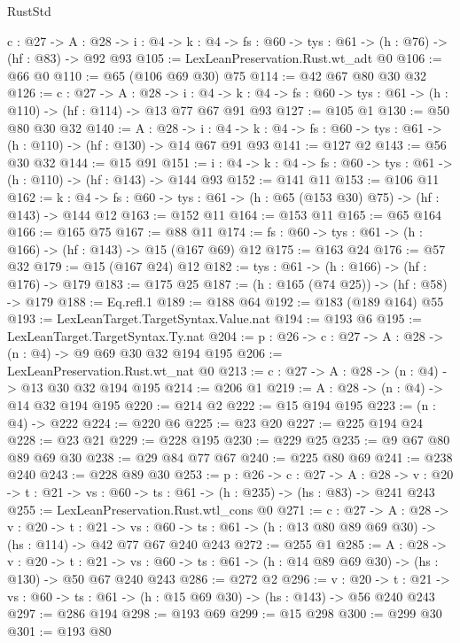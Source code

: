 \begin{lexlean}{RustStd}
\begin{coremodule}
{\begin{coremodule}
{  {c : @27} ->
  {A : @28} ->
  {i : @4} -> {k : @4} -> {fs : @60} -> {tys : @61} -> (h : @76) -> (hf : @83) -> @92 @93
@105 := LexLeanPreservation.Rust.wt_adt @0
@106 := @66 @0
@110 := @65 (@106 @69 @30) @75
@114 := @42 @67 @80 @30 @32
@126 := {c : @27} ->
  {A : @28} ->
  {i : @4} ->
  {k : @4} -> {fs : @60} -> {tys : @61} -> (h : @110) -> (hf : @114) -> @13 @77 @67 @91 @93
@127 := @105 @1
@130 := @50 @80 @30 @32
@140 := {A : @28} ->
  {i : @4} -> {k : @4} -> {fs : @60} -> {tys : @61} -> (h : @110) -> (hf : @130) -> @14 @67 @91 @93
@141 := @127 @2
@143 := @56 @30 @32
@144 := @15 @91
@151 := {i : @4} -> {k : @4} -> {fs : @60} -> {tys : @61} -> (h : @110) -> (hf : @143) -> @144 @93
@152 := @141 @11
@153 := @106 @11
@162 := {k : @4} -> {fs : @60} -> {tys : @61} -> (h : @65 (@153 @30) @75) -> (hf : @143) -> @144 @12
@163 := @152 @11
@164 := @153 @11
@165 := @65 @164
@166 := @165 @75
@167 := @88 @11
@174 := {fs : @60} -> {tys : @61} -> (h : @166) -> (hf : @143) -> @15 (@167 @69) @12
@175 := @163 @24
@176 := @57 @32
@179 := @15 (@167 @24) @12
@182 := {tys : @61} -> (h : @166) -> (hf : @176) -> @179
@183 := @175 @25
@187 := (h : @165 (@74 @25)) -> (hf : @58) -> @179
@188 := Eq.refl.{1}
@189 := @188 @64
@192 := @183 (@189 @164) @55
@193 := LexLeanTarget.TargetSyntax.Value.nat
@194 := @193 @6
@195 := LexLeanTarget.TargetSyntax.Ty.nat
@204 := {p : @26} -> {c : @27} -> {A : @28} -> (n : @4) -> @9 @69 @30 @32 @194 @195
@206 := LexLeanPreservation.Rust.wt_nat @0
@213 := {c : @27} -> {A : @28} -> (n : @4) -> @13 @30 @32 @194 @195
@214 := @206 @1
@219 := {A : @28} -> (n : @4) -> @14 @32 @194 @195
@220 := @214 @2
@222 := @15 @194 @195
@223 := (n : @4) -> @222
@224 := @220 @6
@225 := @23 @20
@227 := @225 @194 @24
@228 := @23 @21
@229 := @228 @195
@230 := @229 @25
@235 := @9 @67 @80 @89 @69 @30
@238 := @29 @84 @77 @67
@240 := @225 @80 @69
@241 := @238 @240
@243 := @228 @89 @30
@253 := {p : @26} ->
  {c : @27} ->
  {A : @28} ->
  {v : @20} -> {t : @21} -> {vs : @60} -> {ts : @61} -> (h : @235) -> (hs : @83) -> @241 @243
@255 := LexLeanPreservation.Rust.wtl_cons @0
@271 := {c : @27} ->
  {A : @28} ->
  {v : @20} ->
  {t : @21} ->
  {vs : @60} -> {ts : @61} -> (h : @13 @80 @89 @69 @30) -> (hs : @114) -> @42 @77 @67 @240 @243
@272 := @255 @1
@285 := {A : @28} ->
  {v : @20} ->
  {t : @21} -> {vs : @60} -> {ts : @61} -> (h : @14 @89 @69 @30) -> (hs : @130) -> @50 @67 @240 @243
@286 := @272 @2
@296 := {v : @20} ->
  {t : @21} -> {vs : @60} -> {ts : @61} -> (h : @15 @69 @30) -> (hs : @143) -> @56 @240 @243
@297 := @286 @194
@298 := @193 @69
@299 := @15 @298
@300 := @299 @30
@301 := @193 @80
}
\end{coremodule}}
\end{coremodule}
\end{lexlean}
